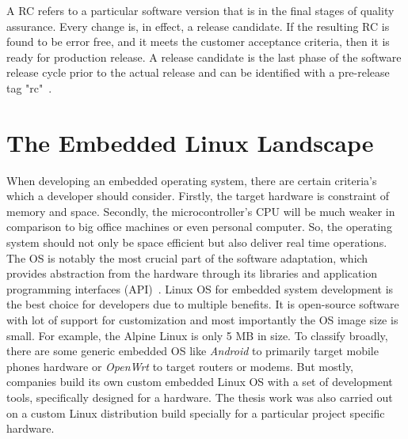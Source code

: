 \noindent A \ac{RC} refers to a particular software version that is in the final stages of quality assurance. Every change is, in effect, a release candidate. If the resulting \ac{RC} is found to be error free, and it meets the customer acceptance criteria, then it is ready for production release. A release candidate is the last phase of the software release cycle prior to the actual release and can be identified with a pre-release tag "rc"~\parencite{humble2010continuous}.

























\section{The Embedded Linux Landscape}\label{section:embeddedlinux}

When developing an embedded operating system, there are certain criteria’s which a developer should consider.  Firstly, the target hardware is constraint of memory and space. Secondly, the microcontroller’s CPU will be much weaker in comparison to big office machines or even personal computer. So, the operating system should not only be space efficient but also deliver real time operations. The OS is notably the most crucial part of the software adaptation, which  provides abstraction from the hardware through its libraries and application programming interfaces (API)~\parencite{Reference1}. Linux OS for embedded system development is the best choice for developers due to multiple benefits. It is open-source software with lot of support for customization and most importantly the OS image size is small. For example, the Alpine Linux is only 5 MB in size. To classify broadly, there are some generic embedded OS like \emph{Android} to primarily target mobile phones hardware or \emph{OpenWrt} to target routers or modems. But mostly, companies build its own custom embedded Linux OS with a set of development tools, specifically designed for a hardware. The thesis work was also carried out on a custom Linux distribution build specially for a particular project specific hardware.

